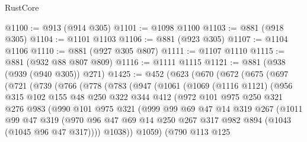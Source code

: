 \begin{lexlean}{RustCore}
\begin{coremodule}
@1100 := @913 (@914 @305)
@1101 := @1098 @1100
@1103 := @881 (@918 @305)
@1104 := @1101 @1103
@1106 := @881 (@923 @305)
@1107 := @1104 @1106
@1110 := @881 (@927 @305 @807)
@1111 := @1107 @1110
@1115 := @881 (@932 @88 @807 @809)
@1116 := @1111 @1115
@1121 := @881 (@938 (@939 (@940 @305)) @271)
@1425 := @452
    (@623
      (@670
        (@672
          (@675
            (@697
              (@721
                (@739
                  (@766
                    (@778
                      (@783
                        (@947
                          (@1061
                            (@1069
                              (@1116 @1121)
                              (@956
                                @315
                                @102
                                @155
                                @48
                                @250
                                @322
                                @344
                                @412
                                (@972
                                  @101
                                  @975
                                  @250
                                  @321
                                  @276
                                  @983
                                  (@990
                                    @101
                                    @975
                                    @321
                                    (@999
                                      @99
                                      @69
                                      @47
                                      @14
                                      @319
                                      @267
                                      (@1011
                                        @99
                                        @47
                                        @319
                                        (@970
                                          @96
                                          @47
                                          @69
                                          @14
                                          @250
                                          @267
                                          @317
                                          @982
                                          @894
                                          (@1043 (@1045 @96 @47 @317))))
                                      @1038))
                                  @1059)
                                (@790
                                  @113
                                  @125

\end{coremodule}
\end{lexlean}
